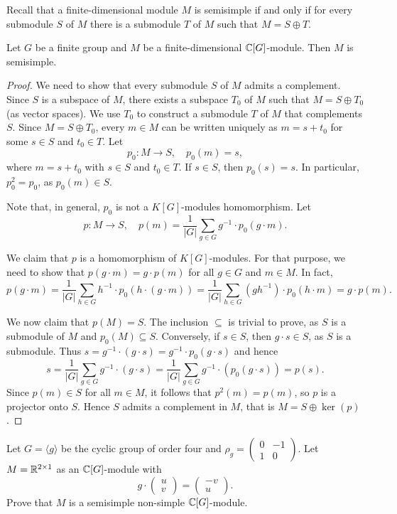Recall that a finite-dimensional module $M$ is semisimple 
if and only if for every submodule $S$ of $M$ there 
is a submodule $T$ of $M$ such that $M=S\oplus T$.    

\begin{theorem}[Maschke]
    Let $G$ be a finite
    group and $M$ be a finite-dimensional $\mathbb{C}[G]$-module.
    Then $M$ is semisimple. 
\end{theorem}

\begin{proof}
We need to show that every submodule $S$ of $M$ admits a complement. 
Since $S$ is a subspace of $M$, there exists a subspace $T_0$ of $M$ 
such that $M=S\oplus T_0$ (as vector spaces). We use 
$T_0$ to construct a submodule $T$ of $M$ that complements $S$. Since $M=S\oplus T_0$, 
every $m\in M$ can be written uniquely as $m=s+t_0$ for some $s\in S$ and $t_0\in T$. 
Let 
\[
p_0\colon M\to S,\quad
p_0(m)=s,
\]
where $m=s+t_0$ with $s\in S$ and $t_0\in T$. 
If $s\in S$, then $p_0(s)=s$. In particular, $p_0^2=p_0$, as 
$p_0(m)\in S$. 

Note that, in general, $p_0$ is not a $K[G]$-modules homomorphism. 
Let 
\[
p\colon M\to S,\quad
p(m)=\frac{1}{|G|}\sum_{g\in G}g^{-1}\cdot p_0(g\cdot m).
\]

We claim that $p$ is a homomorphism of $K[G]$-modules. For that purpose, we need to show that 
$p(g\cdot m)=g\cdot p(m)$ for all $g\in G$ and $m\in M$. In fact, 
\[
p(g\cdot m)=\frac{1}{|G|}\sum_{h\in G}h^{-1}\cdot p_0(h\cdot (g\cdot m))
=\frac{1}{|G|}\sum_{h\in G}(gh^{-1})\cdot p_0(h\cdot m)=g\cdot p(m).
\]

We now claim that $p(M)=S$. The inclusion $\subseteq$ is trivial to prove, as $S$ is a submodule of $M$ 
and $p_0(M)\subseteq S$. Conversely, if $s\in S$, then $g\cdot s\in S$, as 
$S$ is a submodule. Thus 
$s=g^{-1}\cdot (g\cdot s)=g^{-1}\cdot p_0(g\cdot s)$ and hence 
\[
s=\frac{1}{|G|}\sum_{g\in G}g^{-1}\cdot (g\cdot s)=\frac{1}{|G|}\sum_{g\in G}g^{-1}\cdot (p_0(g\cdot s))=p(s).
\]
Since $p(m)\in S$ for all $m\in M$, it follows that $p^2(m)=p(m)$, so $p$ is a projector onto $S$. 
Hence $S$ admits a complement in $M$, that is $M=S\oplus\ker(p)$.
\end{proof}

\begin{exercise}
Let $G=\langle g\rangle$ be the cyclic group 
of order four and $\rho_g=\begin{pmatrix}
0&-1\\
1&0\end{pmatrix}$. 
Let $M=\mathbb{R}^{2\times 1}$ as an $\mathbb{C}[G]$-module with 
\[
g\cdot\begin{pmatrix}u\\v\end{pmatrix}
=\begin{pmatrix}-v\\u\end{pmatrix}.
\]
Prove that $M$ is a semisimple non-simple $\mathbb{C}[G]$-module.
\end{exercise}

